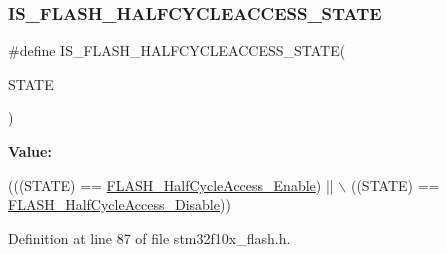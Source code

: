 \subsubsection{\texorpdfstring{I\+S\+\_\+\+F\+L\+A\+S\+H\+\_\+\+H\+A\+L\+F\+C\+Y\+C\+L\+E\+A\+C\+C\+E\+S\+S\+\_\+\+S\+T\+A\+TE}{IS\_FLASH\_HALFCYCLEACCESS\_STATE}}
{\footnotesize\ttfamily \#define I\+S\+\_\+\+F\+L\+A\+S\+H\+\_\+\+H\+A\+L\+F\+C\+Y\+C\+L\+E\+A\+C\+C\+E\+S\+S\+\_\+\+S\+T\+A\+TE(\begin{DoxyParamCaption}\item[{}]{S\+T\+A\+TE }\end{DoxyParamCaption})}

{\bfseries Value\+:}
\begin{DoxyCode}
(((STATE) == \hyperlink{group___half___cycle___enable___disable_ga95adf58ccf48094a9648085ac8d8af13}{FLASH\_HalfCycleAccess\_Enable}) || \(\backslash\)
                                               ((STATE) == 
      \hyperlink{group___half___cycle___enable___disable_gad1ec816fa04b9a45e51c1cc9f1ba8f42}{FLASH\_HalfCycleAccess\_Disable}))
\end{DoxyCode}


Definition at line 87 of file stm32f10x\+\_\+flash.\+h.

